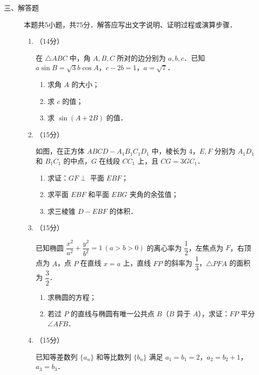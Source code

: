 \begin{description}
    \item[三、解答题] 本题共5小题，共75分．解答应写出文字说明、证明过程或演算步骤．
    \begin{enumerate}[leftmargin=5pt]
      \addtocounter{enumi}{+15}
        \item （14分）

        在 $\triangle ABC$ 中，角 $A,B,C$ 所对的边分别为 $a,b,c$．已知 $a\sin B=\sqrt{3}b\cos A$，$c-2b=1$，$a=\sqrt{7}$．

        \begin{enumerate}[label=(\arabic*)]
            \item 求角 $A$ 的大小；
            \item 求 $c$ 的值；
            \item 求 $\sin(A+2B)$ 的值．
        \end{enumerate}

        \item （15分）

        如图，在正方体 $ABCD-A_1B_1C_1D_1$ 中，棱长为 $4$，$E,F$ 分别为 $A_1D_1$ 和 $B_1C_1$ 的中点，$G$ 在线段 $CC_1$ 上，且 $CG=3GC_1$．

        \begin{enumerate}[label=(\arabic*)]
            \item 求证：$GF\perp$ 平面 $EBF$；
            \item 求平面 $EBF$ 和平面 $EBG$ 夹角的余弦值；
            \item 求三棱锥 $D-EBF$ 的体积．
        \end{enumerate}

        \item （15分）

        已知椭圆 $\dfrac{x^2}{a^2}+\dfrac{y^2}{b^2}=1\,(a>b>0)$ 的离心率为 $\dfrac{1}{2}$，左焦点为 $F$，右顶点为 $A$，点 $P$ 在直线 $x=a$ 上，直线 $FP$ 的斜率为 $\dfrac{1}{3}$，$\triangle PFA$ 的面积为 $\dfrac{3}{2}$．

        \begin{enumerate}[label=(\arabic*)]
            \item 求椭圆的方程；
            \item 若过 $P$ 的直线与椭圆有唯一公共点 $B$（$B$ 异于 $A$），求证：$FP$ 平分 $\angle AFB$．
        \end{enumerate}

        \item （15分）

        已知等差数列 $\{a_n\}$ 和等比数列 $\{b_n\}$ 满足 $a_1=b_1=2$，$a_2=b_2+1$，$a_3=b_3$．


\end{enumerate}
\end{description}
